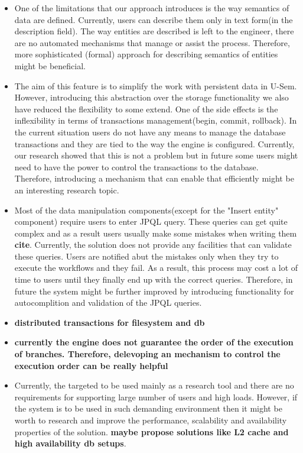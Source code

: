 \documentclass[a4paper, notitlepage]{article}
\begin{document}
\begin{itemize}
\item One of the limitations that our approach introduces is the way semantics of data are defined. Currently, users can describe them only in text form(in the description field). The way entities are described is left to the engineer, there are no automated mechanisms that manage or assist the process. Therefore, more sophisticated (formal) approach for describing semantics of entities might be beneficial.

\item The aim of this feature is to simplify the work with persistent data in U-Sem. However, introducing this abstraction over the storage functionality we also have reduced the flexibility to some extend. One of the side effects is the inflexibility in terms of transactions management(begin, commit, rollback). In the current situation users do not have any means to manage the database transactions and they are tied to the way the engine is configured. Currently, our research showed that this is not a problem but in future some users might need to have the power to control the transactions to the database. Therefore, introducing a mechanism that can enable that efficiently might be an interesting research topic.

\item Most of the data manipulation components(except for the "Insert entity" component) require users to enter JPQL query. These queries can get quite complex and as a result users usually make some mistakes when writing them \textbf{cite}. Currently, the solution does not provide any facilities that can validate these queries. Users are notified abut the mistakes only when they try to execute the workflows and they fail. As a result, this process may cost a lot of time to users until they finally end up with the correct queries. Therefore, in future the system might be further improved by introducing functionality for autocomplition and validation of the JPQL queries.

\item \textbf{distributed transactions for filesystem and db}

\item \textbf{currently the engine does not guarantee the order of the execution of branches. Therefore, delevoping an mechanism to control the execution order can be really helpful}

\item Currently, the targeted to be used mainly as a research tool and there are no requirements for supporting large number of users and high loads. However, if the system is to be used in such demanding environment then it might be worth to research and improve the performance, scalability and availability properties of the solution. \textbf{maybe propose solutions like L2 cache and high availability db setups}. 

\end{itemize}
\end{document}
